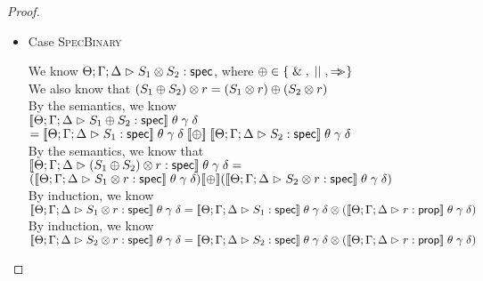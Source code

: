 \begin{proof}
\begin{itemize}
    \item Case \textsc{SpecBinary}
      \begin{tabbedproof}
        \oo We know ${\Theta; \Gamma; \Delta} \vartriangleright {S_1 \otimes S_2} : \mathsf{spec}$, where $\oplus \in \{{\;\&\;, \;||\;, \Rightarrow\!\!\!>}\}$ \\
        \oo We also know that ${(S_1 \oplus S_2)} \otimes {r} = ({S_1} \otimes {r}) \oplus ({S_2} \otimes {r})$ \\
        \oo By the semantics, we know \\
        \oox $[\![{{\Theta; \Gamma; \Delta} \vartriangleright {S_1 \oplus S_2} : \mathsf{spec}}]\!]\;\theta\;\gamma\;\delta $ \\
        \ooox $= [\![{{\Theta; \Gamma; \Delta} \vartriangleright {S_1} : \mathsf{spec}}]\!]\;\theta\;\gamma\;\delta \;[\![{\oplus}]\!] \; [\![{{\Theta; \Gamma; \Delta} \vartriangleright {S_2} : \mathsf{spec}}]\!]\;\theta\;\gamma\;\delta$ \\
        \oo By the semantics, we know that \\
        \oox $[\![{{\Theta; \Gamma; \Delta} \vartriangleright {{(S_1 \oplus S_2)} \otimes {r}} : \mathsf{spec}}]\!]\;\theta\;\gamma\;\delta = $ \\
        \ooox $([\![{{\Theta; \Gamma; \Delta} \vartriangleright {{S_1} \otimes {r}} : \mathsf{spec}}]\!]\;\theta\;\gamma\;\delta) [\![{\oplus}]\!]
               ([\![{{\Theta; \Gamma; \Delta} \vartriangleright {{S_2} \otimes {r}} : \mathsf{spec}}]\!]\;\theta\;\gamma\;\delta)$ \\
        \oo By induction, we know \\
        \oox $[\![{{\Theta; \Gamma; \Delta} \vartriangleright {{S_1} \otimes {r}} : \mathsf{spec}}]\!]\;\theta\;\gamma\;\delta = 
                                   {[\![{{\Theta; \Gamma; \Delta} \vartriangleright {S_1} : \mathsf{spec}}]\!]\;\theta\;\gamma\;\delta} \otimes {([\![{{\Theta; \Gamma; \Delta} \vartriangleright {r} : {\mathsf{prop}}}]\!]\;\theta\;\gamma\;\delta)}$ \\
        \oo By induction, we know \\
        \oox $[\![{{\Theta; \Gamma; \Delta} \vartriangleright {{S_2} \otimes {r}} : \mathsf{spec}}]\!]\;\theta\;\gamma\;\delta = 
                                   {[\![{{\Theta; \Gamma; \Delta} \vartriangleright {S_2} : \mathsf{spec}}]\!]\;\theta\;\gamma\;\delta} \otimes {([\![{{\Theta; \Gamma; \Delta} \vartriangleright {r} : {\mathsf{prop}}}]\!]\;\theta\;\gamma\;\delta)}$ \\


\end{tabbedproof}
\end{itemize}
\end{proof}
